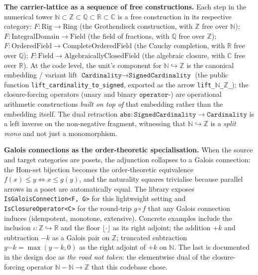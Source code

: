 \documentclass[11pt, a4paper]{report}
\begin{document}
\textbf{The carrier-lattice as a sequence of free constructions.} Each step in the numerical tower $\mathbb{N} \subset \mathbb{Z} \subset \mathbb{Q} \subset \mathbb{R} \subset \mathbb{C}$ is a free construction in its respective category: $F: \mathrm{Rig} \to \mathrm{Ring}$ (the Grothendieck construction, with $\mathbb{Z}$ free over $\mathbb{N}$); $F: \mathrm{IntegralDomain} \to \mathrm{Field}$ (the field of fractions, with $\mathbb{Q}$ free over $\mathbb{Z}$); $F: \mathrm{OrderedField} \to \mathrm{CompleteOrderedField}$ (the Cauchy completion, with $\mathbb{R}$ free over $\mathbb{Q}$); $F: \mathrm{Field} \to \mathrm{AlgebraicallyClosedField}$ (the algebraic closure, with $\mathbb{C}$ free over $\mathbb{R}$). At the code level, the unit's component for $\mathbb{N} \hookrightarrow \mathbb{Z}$ is the canonical embedding / variant lift $\texttt{Cardinality} \to \texttt{SignedCardinality}$ (the public function \texttt{lift\_cardinality\_to\_signed}, exported as the arrow \texttt{lift\_$\mathbb{N}$\_$\mathbb{Z}$\_}); the closure-forcing operators (unary and binary $\texttt{operator-}$) are operational arithmetic constructions \emph{built on top of} that embedding rather than the embedding itself. The dual retraction $\texttt{abs}: \texttt{SignedCardinality} \to \texttt{Cardinality}$ is a left inverse on the non-negative fragment, witnessing that $\mathbb{N} \hookrightarrow \mathbb{Z}$ is a \emph{split mono} and not just a monomorphism.

\textbf{Galois connections as the order-theoretic specialisation.} When the source and target categories are posets, the adjunction collapses to a Galois connection: the Hom-set bijection becomes the order-theoretic equivalence $f(x) \le y \iff x \le g(y)$, and the naturality squares trivialise because parallel arrows in a poset are automatically equal. The library exposes \texttt{IsGaloisConnection<F, G>} for this lightweight setting and \texttt{IsClosureOperator<C>} for the round-trip $g \circ f$ that any Galois connection induces (idempotent, monotone, extensive). Concrete examples include the inclusion $\iota: \mathbb{Z} \hookrightarrow \mathbb{R}$ and the floor $\lfloor \cdot \rfloor$ as its right adjoint; the addition $+k$ and subtraction $-k$ as a Galois pair on $\mathbb{Z}$; truncated subtraction $y \dot{-} k = \max(y - k, 0)$ as the right adjoint of $+k$ on $\mathbb{N}$. The last is documented in the design doc as \emph{the road not taken}: the elementwise dual of the closure-forcing operator $\mathbb{N} - \mathbb{N} \to \mathbb{Z}$ that this codebase chose.
\end{document}
